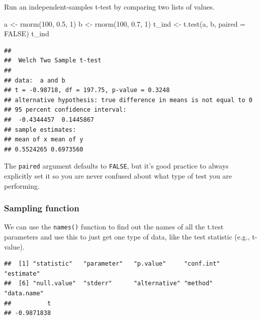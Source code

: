 \documentclass[
  oneside]{book}
\newenvironment{Shaded}{\begin{snugshade}}{\end{snugshade}}
\newcommand{\AttributeTok}[1]{\textcolor[rgb]{0.77,0.63,0.00}{#1}}
\newcommand{\ConstantTok}[1]{\textcolor[rgb]{0.00,0.00,0.00}{#1}}
\newcommand{\DecValTok}[1]{\textcolor[rgb]{0.00,0.00,0.81}{#1}}
\newcommand{\FloatTok}[1]{\textcolor[rgb]{0.00,0.00,0.81}{#1}}
\newcommand{\FunctionTok}[1]{\textcolor[rgb]{0.00,0.00,0.00}{#1}}
\newcommand{\NormalTok}[1]{#1}
\newcommand{\OtherTok}[1]{\textcolor[rgb]{0.56,0.35,0.01}{#1}}
\newcommand{\SpecialCharTok}[1]{\textcolor[rgb]{0.00,0.00,0.00}{#1}}
\begin{document}
Run an independent-samples t-test by comparing two lists of values.

\begin{Shaded}
\begin{Highlighting}[]
\NormalTok{a }\OtherTok{\textless{}{-}} \FunctionTok{rnorm}\NormalTok{(}\DecValTok{100}\NormalTok{, }\FloatTok{0.5}\NormalTok{, }\DecValTok{1}\NormalTok{)}
\NormalTok{b }\OtherTok{\textless{}{-}} \FunctionTok{rnorm}\NormalTok{(}\DecValTok{100}\NormalTok{, }\FloatTok{0.7}\NormalTok{, }\DecValTok{1}\NormalTok{)}
\NormalTok{t\_ind }\OtherTok{\textless{}{-}} \FunctionTok{t.test}\NormalTok{(a, b, }\AttributeTok{paired =} \ConstantTok{FALSE}\NormalTok{)}
\NormalTok{t\_ind}
\end{Highlighting}
\end{Shaded}

\begin{verbatim}
## 
##  Welch Two Sample t-test
## 
## data:  a and b
## t = -0.98718, df = 197.75, p-value = 0.3248
## alternative hypothesis: true difference in means is not equal to 0
## 95 percent confidence interval:
##  -0.4344457  0.1445867
## sample estimates:
## mean of x mean of y 
## 0.5524265 0.6973560
\end{verbatim}

\begin{warning}
The \texttt{paired} argument defaults to \texttt{FALSE}, but it's good practice to always explicitly set it so you are never confused about what type of test you are performing.

\end{warning}

\hypertarget{sampling-t}{%
\subsubsection{Sampling function}\label{sampling-t}}

We can use the \texttt{names()} function to find out the names of all the t.test parameters and use this to just get one type of data, like the test statistic (e.g., t-value).

\begin{Shaded}
\end{Shaded}

\begin{verbatim}
##  [1] "statistic"   "parameter"   "p.value"     "conf.int"    "estimate"   
##  [6] "null.value"  "stderr"      "alternative" "method"      "data.name"  
##          t 
## -0.9871838
\end{verbatim}
\end{document}

